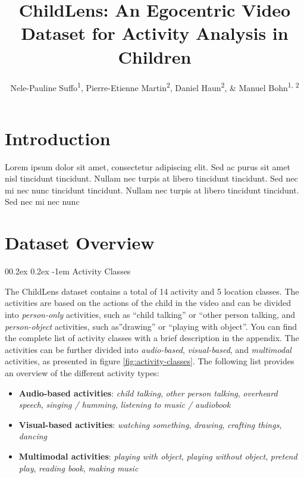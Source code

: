 \documentclass[
  man,floatsintext]{apa6}
\title{ChildLens: An Egocentric Video Dataset for Activity Analysis in Children}
\author{Nele-Pauline Suffo\textsuperscript{1}, Pierre-Etienne Martin\textsuperscript{2}, Daniel Haun\textsuperscript{2}, \& Manuel Bohn\textsuperscript{1, 2}}
\date{}
\affiliation{\vspace{0.5cm}\textsuperscript{1} Institute of Psychology in Education, Leuphana University Lüneburg\\\textsuperscript{2} Max Planck Institute for Evolutionary Anthropology}
\makeatletter
\providecommand{\tightlist}{%
  \setlength{\itemsep}{0pt}\setlength{\parskip}{0pt}}
\let\oldparagraph\paragraph
\renewcommand{\paragraph}{
    \@ifstar
      \xxxParagraphStar
      \xxxParagraphNoStar
  }
\newcommand{\xxxParagraphStar}[1]{\oldparagraph*{#1}\mbox{}}
\newcommand{\xxxParagraphNoStar}[1]{\oldparagraph{#1}\mbox{}}
\renewcommand{\paragraph}{\@startsection{paragraph}{4}{\parindent}%
  {0\baselineskip \@plus 0.2ex \@minus 0.2ex}%
  {-1em}%
  {\normalfont\normalsize\bfseries\itshape\typesectitle}}
\makeatother
\begin{document}
\maketitle

\section{Introduction}\label{introduction}

Lorem ipsum dolor sit amet, consectetur adipiscing elit. Sed ac purus sit amet nisl tincidunt tincidunt. Nullam nec turpis at libero tincidunt tincidunt. Sed nec mi nec nunc tincidunt tincidunt. Nullam nec turpis at libero tincidunt tincidunt. Sed nec mi nec nunc

\section{Dataset Overview}\label{dataset-overview}

\paragraph{Activity Classes}\label{activity-classes}

The ChildLens dataset contains a total of 14 activity and 5 location classes. The activities are based on the actions of the child in the video and can be divided into \emph{person-only} activities, such as ``child talking'' or ``other person talking, and \emph{person-object} activities, such as''drawing'' or ``playing with object''. You can find the complete list of activity classes with a brief description in the appendix. The activities can be further divided into \emph{audio-based}, \emph{visual-based}, and \emph{multimodal} activities, as presented in figure \ref{fig:activity-classes}. The following list provides an overview of the different activity types:

\begin{itemize}
\tightlist
\item
  \textbf{Audio-based activities}: \emph{child talking}, \emph{other person talking}, \emph{overheard speech}, \emph{singing / humming}, \emph{listening to music / audiobook}
\item
  \textbf{Visual-based activities}: \emph{watching something}, \emph{drawing}, \emph{crafting things}, \emph{dancing}
\item
  \textbf{Multimodal activities}: \emph{playing with object}, \emph{playing without object}, \emph{pretend play}, \emph{reading book}, \emph{making music}
\end{itemize}
\end{document}
